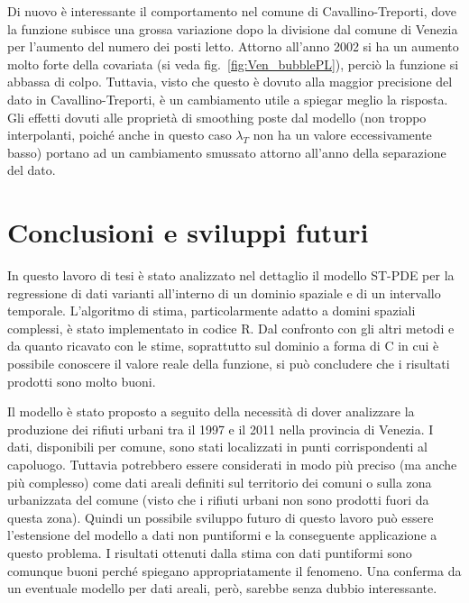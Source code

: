 \documentclass[a4paper,11pt,twoside,openright]{book}							%
\begin{document}
Di nuovo è interessante il comportamento nel comune di Cavallino-Treporti, dove la funzione subisce una grossa variazione dopo la divisione dal comune di Venezia per l'aumento del numero dei posti letto. Attorno all'anno 2002 si ha un aumento molto forte della covariata (si veda fig.~\ref{fig:Ven_bubblePL}), perciò la funzione si abbassa di colpo. Tuttavia, visto che questo è dovuto alla maggior precisione del dato in Cavallino-Treporti, è un cambiamento utile a spiegar meglio la risposta. Gli effetti dovuti alle proprietà di smoothing poste dal modello (non troppo interpolanti, poiché anche in questo caso $\lambda_T$ non ha un valore eccessivamente basso) portano ad un cambiamento smussato attorno all'anno della separazione del dato.
\newpage
\thispagestyle{empty}

\chapter{Conclusioni e sviluppi futuri}
\label{cap:conclusione}

In questo lavoro di tesi è stato analizzato nel dettaglio il modello ST-PDE per la regressione di dati varianti all'interno di un dominio spaziale e di un intervallo temporale. L'algoritmo di stima, particolarmente adatto a domini spaziali complessi, è stato implementato in codice R. Dal confronto con gli altri metodi e da quanto ricavato con le stime, soprattutto sul dominio a forma di C in cui è possibile conoscere il valore reale della funzione, si può concludere che i risultati prodotti sono molto buoni.

Il modello è stato proposto a seguito della necessità di dover analizzare la produzione dei rifiuti urbani tra il 1997 e il 2011 nella provincia di Venezia. I dati, disponibili per comune, sono stati localizzati in punti corrispondenti al capoluogo. Tuttavia potrebbero essere considerati in modo più preciso (ma anche più complesso) come dati areali definiti sul territorio dei comuni o sulla zona urbanizzata del comune (visto che i rifiuti urbani non sono prodotti fuori da questa zona). Quindi un possibile sviluppo futuro di questo lavoro può essere l'estensione del modello a dati non puntiformi e la conseguente applicazione a questo problema. I risultati ottenuti dalla stima con dati puntiformi sono comunque buoni perché spiegano appropriatamente il fenomeno. Una conferma da un eventuale modello per dati areali, però, sarebbe senza dubbio interessante.
\end{document}
